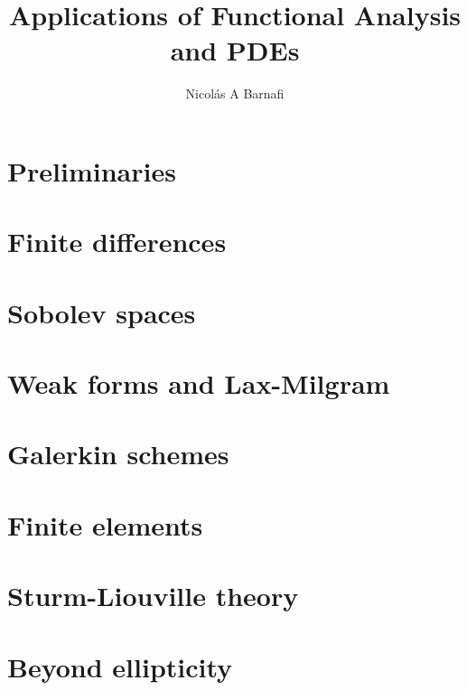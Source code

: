\documentclass{scrbook}
\title{Applications of Functional Analysis and PDEs}
\author{Nicol\'as A Barnafi}
\date{} %
\begin{document}
\maketitle
\tableofcontents
\mainmatter



\chapter{Preliminaries}\label{chapter:preliminaries}

\chapter{Finite differences}\label{chapter:finite-differences}

\chapter{Sobolev spaces}\label{chapter:sobolev}

\chapter{Weak forms and Lax-Milgram}\label{chapter:weak-forms-lax-milgram}

\chapter{Galerkin schemes}\label{chapter:galerkin}

\chapter{Finite elements}\label{chapter:fem}

\chapter{Sturm-Liouville theory}\label{chapter:sturm-liouville}

\chapter{Beyond ellipticity}\label{chapter:beyond-ellipticity}

\end{document}
